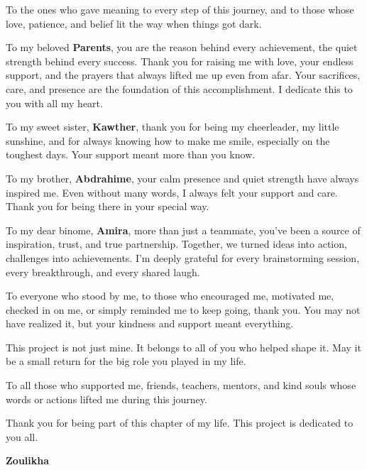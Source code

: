 \vspace{4cm}

To the ones who gave meaning to every step of this journey, and to those whose love, patience,  
and belief lit the way when things got dark.

To my beloved \textbf{Parents}, you are the reason behind every achievement, the quiet strength behind  
every success. Thank you for raising me with love, your endless support, and the prayers that  
always lifted me up even from afar. Your sacrifices, care, and presence are the foundation of  
this accomplishment. I dedicate this to you with all my heart.

To my sweet sister, \textbf{Kawther}, thank you for being my cheerleader, my little sunshine, and for  
always knowing how to make me smile, especially on the toughest days. Your support meant  
more than you know.

To my brother, \textbf{Abdrahime}, your calm presence and quiet strength have always inspired me.  
Even without many words, I always felt your support and care. Thank you for being there in your  
special way.

To my dear binome, \textbf{Amira}, more than just a teammate, you've been a source of inspiration,  
trust, and true partnership. Together, we turned ideas into action, challenges into achievements.  
I’m deeply grateful for every brainstorming session, every breakthrough, and every shared  
laugh.

To everyone who stood by me, to those who encouraged me, motivated me, checked in on me,  
or simply reminded me to keep going, thank you. You may not have realized it, but your  
kindness and support meant everything.

This project is not just mine. It belongs to all of you who helped shape it. May it be a small return  
for the big role you played in my life.

To all those who supported me, friends, teachers, mentors, and kind souls whose words or  
actions lifted me during this journey.

Thank you for being part of this chapter of my life.  
This project is dedicated to you all.

\begin{center}
\Large \textbf{Zoulikha}
\end{center}
